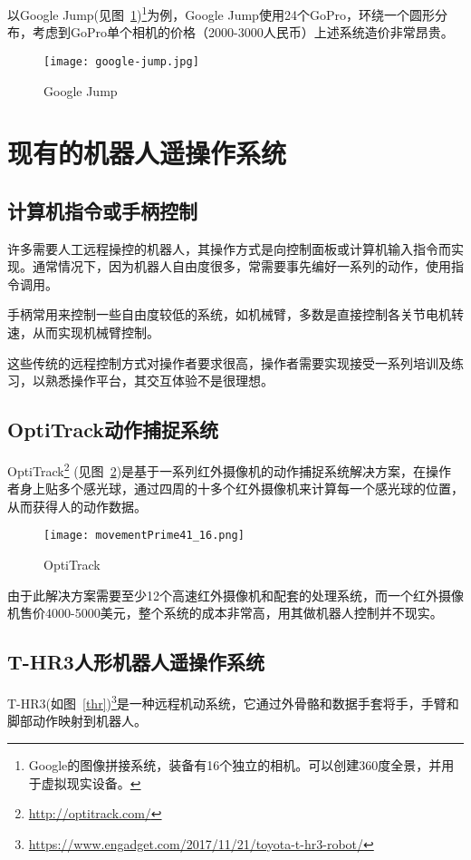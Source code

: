 以Google Jump(见图~\ref{jump})\footnote{Google的图像拼接系统，装备有16个独立的相机。可以创建360度全景，并用于虚拟现实设备。}为例，Google Jump使用24个GoPro，环绕一个圆形分布，考虑到GoPro单个相机的价格（2000-3000人民币）上述系统造价非常昂贵。

\begin{figure}[htbp]
\small
\centering
\texttt{[image: google-jump.jpg]}
\caption{Google Jump} 
\label{jump}
\end{figure}

\section{现有的机器人遥操作系统}

\subsection{计算机指令或手柄控制}
许多需要人工远程操控的机器人，其操作方式是向控制面板或计算机输入指令而实现。通常情况下，因为机器人自由度很多，常需要事先编好一系列的动作，使用指令调用。

手柄常用来控制一些自由度较低的系统，如机械臂，多数是直接控制各关节电机转速，从而实现机械臂控制。

这些传统的远程控制方式对操作者要求很高，操作者需要实现接受一系列培训及练习，以熟悉操作平台，其交互体验不是很理想。

\subsection{OptiTrack动作捕捉系统}
OptiTrack\footnote{\url{http://optitrack.com/}} (见图~\ref{opti})是基于一系列红外摄像机的动作捕捉系统解决方案，在操作者身上贴多个感光球，通过四周的十多个红外摄像机来计算每一个感光球的位置，从而获得人的动作数据。
\begin{figure}[H]
\small
\centering
\texttt{[image: movementPrime41\_16.png]}
\caption{OptiTrack} 
\label{opti}
\end{figure}
由于此解决方案需要至少12个高速红外摄像机和配套的处理系统，而一个红外摄像机售价4000-5000美元，整个系统的成本非常高，用其做机器人控制并不现实。

\subsection{T-HR3人形机器人遥操作系统}

T-HR3(如图~\ref{thr})\footnote{\url{https://www.engadget.com/2017/11/21/toyota-t-hr3-robot/}}是一种远程机动系统，它通过外骨骼和数据手套将手，手臂和脚部动作映射到机器人。

